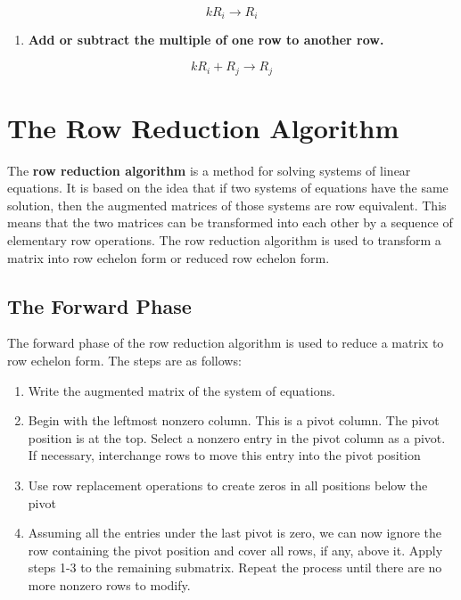 \documentclass[
  letterpaper,
  DIV=11,
  numbers=noendperiod]{scrreprt}
\providecommand{\tightlist}{%
  \setlength{\itemsep}{0pt}\setlength{\parskip}{0pt}}\usepackage{longtable,booktabs,array}
\begin{document}
\[
kR_i \rightarrow R_i
\]

\begin{enumerate}
\def\labelenumi{\arabic{enumi}.}
\setcounter{enumi}{2}
\tightlist
\item
  \textbf{Add or subtract the multiple of one row to another row.}
\end{enumerate}

\[
kR_i + R_j \rightarrow R_j
\]

\hypertarget{the-row-reduction-algorithm}{%
\section*{The Row Reduction
Algorithm}\label{the-row-reduction-algorithm}}


The \textbf{row reduction algorithm} is a method for solving systems of
linear equations. It is based on the idea that if two systems of
equations have the same solution, then the augmented matrices of those
systems are row equivalent. This means that the two matrices can be
transformed into each other by a sequence of elementary row operations.
The row reduction algorithm is used to transform a matrix into row
echelon form or reduced row echelon form.

\hypertarget{the-forward-phase}{%
\subsection*{The Forward Phase}\label{the-forward-phase}}

The forward phase of the row reduction algorithm is used to reduce a
matrix to row echelon form. The steps are as follows:

\begin{enumerate}
\def\labelenumi{\arabic{enumi}.}
\tightlist
\item
  Write the augmented matrix of the system of equations.
\item
  Begin with the leftmost nonzero column. This is a pivot column. The
  pivot position is at the top. Select a nonzero entry in the pivot
  column as a pivot. If necessary, interchange rows to move this entry
  into the pivot position
\item
  Use row replacement operations to create zeros in all positions below
  the pivot
\item
  Assuming all the entries under the last pivot is zero, we can now
  ignore the row containing the pivot position and cover all rows, if
  any, above it. Apply steps 1-3 to the remaining submatrix. Repeat the
  process until there are no more nonzero rows to modify.
\end{enumerate}
\end{document}
